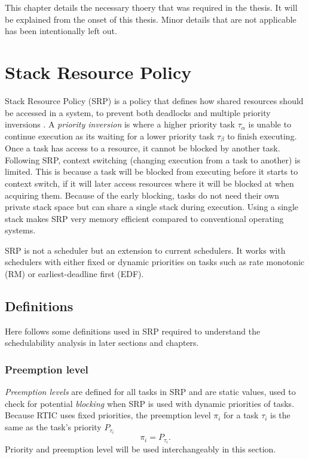 This chapter details the necessary thoery that was required in the thesis.
It will be explained from the onset of this thesis. Minor details
that are not applicable has been intentionally left out.

\section{Stack Resource Policy}
\label{theory:srp}
Stack Resource Policy (SRP) is a policy that defines how shared resources
should be accessed in a system, to prevent both deadlocks and multiple priority
inversions \cite{srp}. A \emph{priority inversion} is where a higher priority
task $\tau_\alpha$ is unable to continue execution as its waiting for a lower
priority task $\tau_\beta$ to finish executing. Once a task has access to a
resource, it cannot be blocked by another task. Following SRP, context
switching (changing execution from a task to another) is limited. This is
because a task will be blocked from executing before it starts to context
switch, if it will later access resources where it will be blocked at when
acquiring them. Because of the early blocking, tasks do not need their own
private stack space but can share a single stack during execution. Using a
single stack makes SRP very memory efficient compared to conventional operating
systems\cite{hardrealtimecomputingsystems}.

SRP is not a scheduler but an extension to current schedulers. It works with
schedulers with either fixed or dynamic priorities on tasks such as rate
monotonic (RM) or earliest-deadline first (EDF).

\subsection{Definitions}
\label{theory:srp:definitions}
Here follows some definitions used in SRP required to understand the
schedulability analysis in later sections and chapters.

\subsubsection{Preemption level}
\label{theory:srp:definitions:preemption}
\emph{Preemption levels} are defined for all tasks in SRP and are static
values, used to check for potential \emph{blocking} when SRP is used with
dynamic priorities of tasks. Because RTIC uses fixed priorities, the
preemption level $\pi_i$ for a task $\tau_i$ is the same as the task's priority
$P_{\tau_i}$
\begin{equation}
    \pi_i = P_{\tau_i}.
\end{equation}
Priority and preemption level will be used interchangeably in this section.

